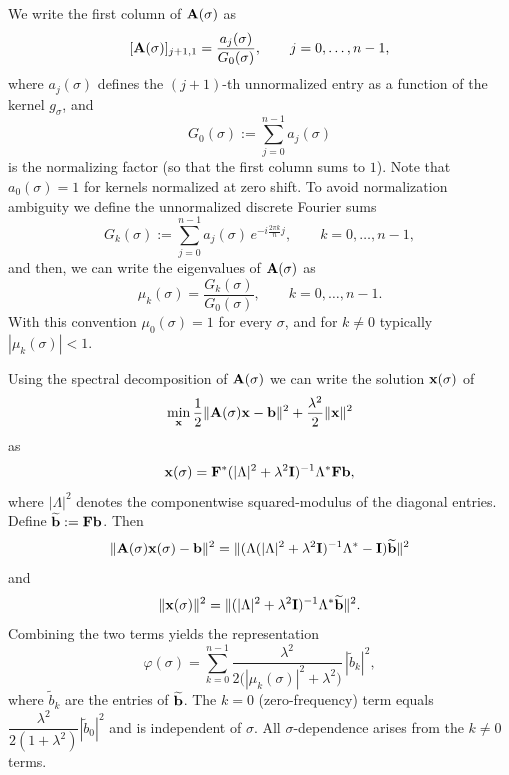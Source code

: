 \documentclass[onefignum,onetabnum]{siamart171218}
\newcommand{\bA}{{\bf A}}
\newcommand{\bF}{{\bf F}}
\newcommand{\bI}{{\bf I}}
\newcommand{\bb}{{\bf b}}
\newcommand{\bx}{{\bf x}}
\begin{document}
We write the first column of \(\bA(\sigma)\) as
\[
[\bA(\sigma)]_{j+1,1} = \frac{a_j(\sigma)}{G_0(\sigma)}, \qquad j=0,\dots,n-1,
\]
where \(a_j(\sigma)\) defines the \((j+1)\)-th unnormalized entry as a function of the kernel \(g_\sigma\), and
\[
G_0(\sigma) := \sum_{j=0}^{n-1} a_j(\sigma)
\]
is the normalizing factor (so that the first column sums to \(1\)). Note that \(a_0(\sigma)=1\) for kernels normalized at zero shift. To avoid normalization ambiguity we define the unnormalized discrete Fourier sums
\begin{equation*}
G_k(\sigma):=\sum_{j=0}^{n-1} a_j(\sigma)\,e^{-i\frac{2\pi k}{n}j},\qquad k=0,\dots,n-1,
\end{equation*}
and then, we can write the eigenvalues of $\bA(\sigma)$ as
\begin{equation*}
\mu_k(\sigma)=\frac{G_k(\sigma)}{G_0(\sigma)},\qquad k=0,\dots,n-1.
\end{equation*}
With this convention \(\mu_0(\sigma)=1\) for every \(\sigma\), and for \(k\neq0\) typically \(|\mu_k(\sigma)|<1\).

Using the spectral decomposition of \(\bA(\sigma)\) we can write the solution $\bx(\sigma)$ of
\[ \min_{\bx} \frac{1}{2}\|\bA(\sigma) \bx - \bb \|^2 + \frac{\lambda^2}{2}\| \bx\|^2\]
as
\begin{equation*}
\bx(\sigma)=\bF^*(|\Lambda|^2+\lambda^2\bI)^{-1}\Lambda^*\bF\bb,
\end{equation*}
where \(|\Lambda|^2\) denotes the componentwise squared-modulus of the diagonal entries. Define \(\widetilde{\bb}:=\bF\bb\). Then
\begin{equation*}
\|\bA(\sigma)\bx(\sigma)-\bb\|^2
=
\|(\Lambda(|\Lambda|^2+\lambda^2\bI)^{-1}\Lambda^*-\bI)\widetilde{\bb}\|^2
\end{equation*}
and
\begin{equation*}
\|\bx(\sigma)\|^2=\|(|\Lambda|^2+\lambda^2\bI)^{-1}\Lambda^*\widetilde{\bb}\|^2.
\end{equation*}
Combining the two terms yields the representation
\begin{equation}\label{eq:phi_fourier}
\varphi(\sigma)=\sum_{k=0}^{n-1}\frac{\lambda^2}{2\bigl(|\mu_k(\sigma)|^2+\lambda^2\bigr)}\,|\tilde b_k|^2,
\end{equation}
where \(\tilde b_k\) are the entries of \(\widetilde{\bb}\). The \(k=0\) (zero-frequency) term equals \(\dfrac{\lambda^2}{2(1+\lambda^2)}|\tilde b_0|^2\) and is independent of \(\sigma\). All \(\sigma\)-dependence arises from the \(k\neq0\) terms.
\end{document}
